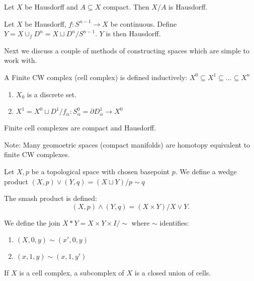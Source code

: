 \documentclass{article}
\begin{document}
    \begin{lem}
        Let $ X $ be Hausdorff and $ A\subseteq X $ compact. Then $ X / A $ is Hausdorff.
    \end{lem}
    \begin{lem}
        Let $ X $ be Hausdorff, $f:S^{n-1}\to X$ be continuous. Define $Y=X\cup_f D^{n}=X\sqcup D^{n} / S^{n-1}$. $Y$ is then Hausdorff.
    \end{lem}
    Next we discuss a couple of methods of constructing spaces which are simple to work with.
    \begin{defn}
        A Finite CW complex (cell complex) is defined inductively:
        $X^{0}\subseteq X^{1}\subseteq \dots\subseteq X^{n}$
        \begin{enumerate}
            \item $X_0$ is a discrete set.
            \item $X^1= X^{0}\sqcup D^1 / f_\alpha : S^{0}_\alpha=\partial D^{1}_\alpha \to X^{0}$ %
        \end{enumerate}
    \end{defn}
    \begin{thm}
        Finite cell complexes are compact and Hausdorff.

        Note: Many geomoetric spaces (compact manifolds) are homotopy equivalent to finite CW complexes.
    \end{thm}

    \begin{defn}
        
    Let $X,p$ be a topological space with chosen basepoint $p$. We define a wedge product
    $(X,p)\lor (Y,q)=(X\sqcup Y) / p\sim q$ 
    \end{defn}

    \begin{defn}
        The smash product is defined:
        \[
            (X,p)\land(Y,q) = (X\times Y) / X\lor Y
        .\]  
    \end{defn}
    \begin{defn}
        We define the join $X*Y=X\times Y\times I/\sim $ where $\sim $ identifies:
        \begin{enumerate}
            \item $(X,0,y)\sim (x',0,y)$
            \item $(x,1,y)\sim (x,1,y')$
        \end{enumerate}
    \end{defn}
    \begin{defn}
        If $X$ is a cell complex, a subcomplex of $X$ is a closed union of cells.
    \end{defn}
\end{document}
